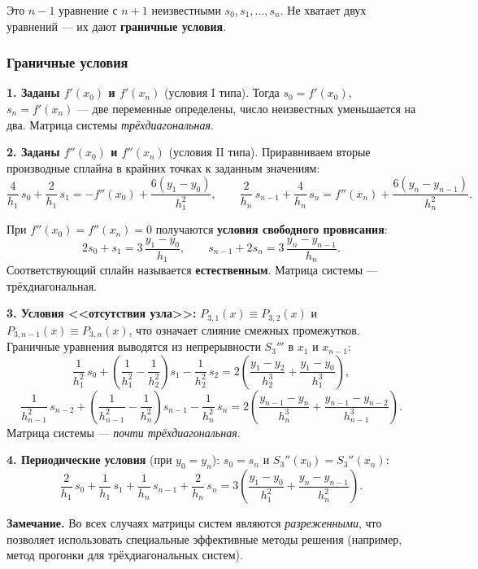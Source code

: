 Это $n - 1$ уравнение с $n + 1$ неизвестными $s_0, s_1, \ldots, s_n$. Не хватает двух уравнений --- их дают \textbf{граничные условия}.

\subsubsection*{Граничные условия}

\textbf{1. Заданы $f'(x_0)$ и $f'(x_n)$} (условия I типа). Тогда $s_0 = f'(x_0)$, $s_n = f'(x_n)$ --- две переменные определены, число неизвестных уменьшается на два. Матрица системы \textit{трёхдиагональная}.

\textbf{2. Заданы $f''(x_0)$ и $f''(x_n)$} (условия II типа). Приравниваем вторые производные сплайна в крайних точках к заданным значениям:
\[
    \frac{4}{h_1}\,s_0 + \frac{2}{h_1}\,s_1 = -f''(x_0) + \frac{6(y_1 - y_0)}{h_1^2}, \qquad
    \frac{2}{h_n}\,s_{n-1} + \frac{4}{h_n}\,s_n = f''(x_n) + \frac{6(y_n - y_{n-1})}{h_n^2}.
\]

При $f''(x_0) = f''(x_n) = 0$ получаются \textbf{условия свободного провисания}:
\[
    2s_0 + s_1 = 3\,\frac{y_1 - y_0}{h_1}, \qquad s_{n-1} + 2s_n = 3\,\frac{y_n - y_{n-1}}{h_n}.
\]
Соответствующий сплайн называется \textbf{естественным}. Матрица системы --- трёхдиагональная.

\textbf{3. Условия <<отсутствия узла>>:} $P_{3,1}(x) \equiv P_{3,2}(x)$ и $P_{3,n-1}(x) \equiv P_{3,n}(x)$, что означает слияние смежных промежутков. Граничные уравнения выводятся из непрерывности $S_3'''$ в $x_1$ и $x_{n-1}$:
\[
    \frac{1}{h_1^2}\,s_0 + \left(\frac{1}{h_1^2} - \frac{1}{h_2^2}\right)s_1 - \frac{1}{h_2^2}\,s_2 = 2\left(\frac{y_1 - y_2}{h_2^3} + \frac{y_1 - y_0}{h_1^3}\right),
\]
\[
    \frac{1}{h_{n-1}^2}\,s_{n-2} + \left(\frac{1}{h_{n-1}^2} - \frac{1}{h_n^2}\right)s_{n-1} - \frac{1}{h_n^2}\,s_n = 2\left(\frac{y_{n-1} - y_n}{h_n^3} + \frac{y_{n-1} - y_{n-2}}{h_{n-1}^3}\right).
\]
Матрица системы --- \textit{почти трёхдиагональная}.

\textbf{4. Периодические условия} (при $y_0 = y_n$): $s_0 = s_n$ и $S_3''(x_0) = S_3''(x_n)$:
\[
    \frac{2}{h_1}\,s_0 + \frac{1}{h_1}\,s_1 + \frac{1}{h_n}\,s_{n-1} + \frac{2}{h_n}\,s_n = 3\left(\frac{y_1 - y_0}{h_1^2} + \frac{y_n - y_{n-1}}{h_n^2}\right).
\]

\textbf{Замечание.} Во всех случаях матрицы систем являются \textit{разреженными}, что позволяет использовать специальные эффективные методы решения (например, метод прогонки для трёхдиагональных систем).


